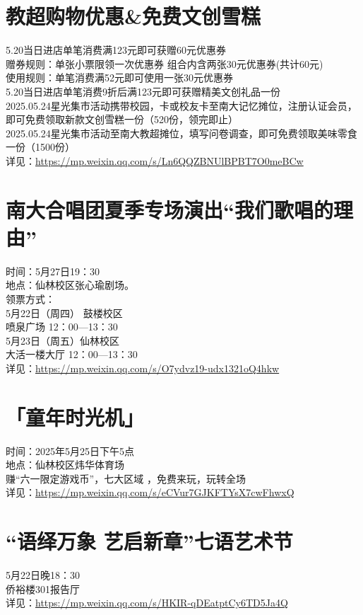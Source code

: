 \documentclass[letterpaper, 12pt]{article}
\begin{document}
\begin{multicols}{2}
\section{教超购物优惠\&免费文创雪糕} %
5.20当日进店单笔消费满123元即可获赠60元优惠券
\\赠券规则：单张小票限领一次优惠券 组合内含两张30元优惠券(共计60元)
\\使用规则：单笔消费满52元即可使用一张30元优惠券
\\5.20当日进店单笔消费9折后满123元即可获赠精美文创礼品一份
\\2025.05.24星光集市活动携带校园，卡或校友卡至南大记忆摊位，注册认证会员，即可免费领取新款文创雪糕一份（520份，领完即止）
\\2025.05.24星光集市活动至南大教超摊位，填写问卷调查，即可免费领取美味零食一份（1500份）
\\详见：\url{https://mp.weixin.qq.com/s/Ln6QQZBNUlBPBT7O0meBCw}
\section{南大合唱团夏季专场演出“我们歌唱的理由”} %
时间：5月27日19：30
\\地点：仙林校区张心瑜剧场。
\\领票方式：
\\5月22日（周四） 鼓楼校区
\\喷泉广场 12：00—13：30
\\5月23日（周五）仙林校区
\\大活一楼大厅 12：00—13：30
\\详见：\url{https://mp.weixin.qq.com/s/O7ydvz19-udx1321oQ4hkw}
\section{「童年时光机」} %
时间：2025年5月25日下午5点
\\地点：仙林校区炜华体育场
\\赚“六一限定游戏币”，七大区域 ，免费来玩，玩转全场
\\详见：\url{https://mp.weixin.qq.com/s/eCVur7GJKFTYsX7cwFhwxQ}

\section{“语绎万象 艺启新章”七语艺术节} %
5月22日晚18：30
\\侨裕楼301报告厅
\\详见：\url{https://mp.weixin.qq.com/s/HKIR-qDEatptCy6TD5Ja4Q}





\end{multicols}
\end{document}
